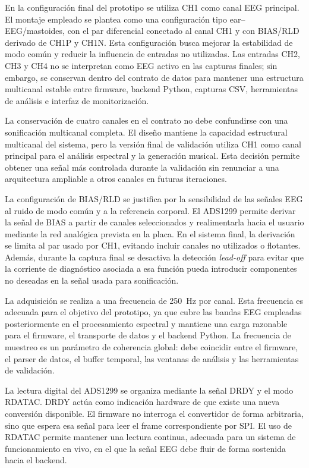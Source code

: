 \documentclass[../main.tex]{subfiles}
\begin{document}
En la configuración final del prototipo se utiliza CH1 como canal EEG principal. El montaje empleado se plantea como una configuración tipo ear--EEG/mastoides, con el par diferencial conectado al canal CH1 y con BIAS/RLD derivado de CH1P y CH1N. Esta configuración busca mejorar la estabilidad de modo común y reducir la influencia de entradas no utilizadas. Las entradas CH2, CH3 y CH4 no se interpretan como EEG activo en las capturas finales; sin embargo, se conservan dentro del contrato de datos para mantener una estructura multicanal estable entre firmware, backend Python, capturas CSV, herramientas de análisis e interfaz de monitorización.

La conservación de cuatro canales en el contrato no debe confundirse con una sonificación multicanal completa. El diseño mantiene la capacidad estructural multicanal del sistema, pero la versión final de validación utiliza CH1 como canal principal para el análisis espectral y la generación musical. Esta decisión permite obtener una señal más controlada durante la validación sin renunciar a una arquitectura ampliable a otros canales en futuras iteraciones.

La configuración de BIAS/RLD se justifica por la sensibilidad de las señales EEG al ruido de modo común y a la referencia corporal. El ADS1299 permite derivar la señal de BIAS a partir de canales seleccionados y realimentarla hacia el usuario mediante la red analógica prevista en la placa. En el sistema final, la derivación se limita al par usado por CH1, evitando incluir canales no utilizados o flotantes. Además, durante la captura final se desactiva la detección \textit{lead-off} para evitar que la corriente de diagnóstico asociada a esa función pueda introducir componentes no deseadas en la señal usada para sonificación.

La adquisición se realiza a una frecuencia de \SI{250}{\hertz} por canal. Esta frecuencia es adecuada para el objetivo del prototipo, ya que cubre las bandas EEG empleadas posteriormente en el procesamiento espectral y mantiene una carga razonable para el firmware, el transporte de datos y el backend Python. La frecuencia de muestreo es un parámetro de coherencia global: debe coincidir entre el firmware, el parser de datos, el buffer temporal, las ventanas de análisis y las herramientas de validación.

La lectura digital del ADS1299 se organiza mediante la señal DRDY y el modo RDATAC. DRDY actúa como indicación hardware de que existe una nueva conversión disponible. El firmware no interroga el convertidor de forma arbitraria, sino que espera esa señal para leer el frame correspondiente por SPI. El uso de RDATAC permite mantener una lectura continua, adecuada para un sistema de funcionamiento en vivo, en el que la señal EEG debe fluir de forma sostenida hacia el backend.
\end{document}
